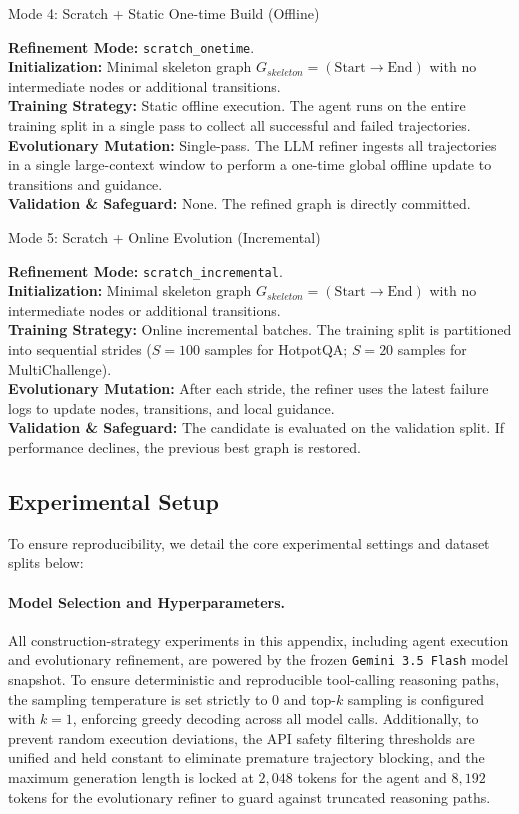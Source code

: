 \begin{modebox}{Mode 4: Scratch + Static One-time Build (Offline)}
\footnotesize\raggedright
\textbf{Refinement Mode:} \texttt{scratch\_onetime}. \\
\textbf{Initialization:} Minimal skeleton graph $G_{skeleton} = (\text{Start} \rightarrow \text{End})$ with no intermediate nodes or additional transitions. \\
\textbf{Training Strategy:} Static offline execution. The agent runs on the entire training split in a single pass to collect all successful and failed trajectories. \\
\textbf{Evolutionary Mutation:} Single-pass. The LLM refiner ingests all trajectories in a single large-context window to perform a one-time global offline update to transitions and guidance. \\
\textbf{Validation \& Safeguard:} None. The refined graph is directly committed.
\end{modebox}
\begin{modebox}{Mode 5: Scratch + Online Evolution (Incremental)}
\footnotesize\raggedright
\textbf{Refinement Mode:} \texttt{scratch\_incremental}. \\
\textbf{Initialization:} Minimal skeleton graph $G_{skeleton} = (\text{Start} \rightarrow \text{End})$ with no intermediate nodes or additional transitions. \\
\textbf{Training Strategy:} Online incremental batches. The training split is partitioned into sequential strides ($S=100$ samples for HotpotQA; $S=20$ samples for MultiChallenge). \\
\textbf{Evolutionary Mutation:} After each stride, the refiner uses the latest failure logs to update nodes, transitions, and local guidance. \\
\textbf{Validation \& Safeguard:} The candidate is evaluated on the validation split. If performance declines, the previous best graph is restored.
\end{modebox}

\subsection{Experimental Setup}
\label{app:construction_setup}
To ensure reproducibility, we detail the core experimental settings and dataset splits below:
\paragraph{Model Selection and Hyperparameters.}
All construction-strategy experiments in this appendix, including agent execution and evolutionary refinement, are powered by the frozen \texttt{Gemini 3.5 Flash} model snapshot. To ensure deterministic and reproducible tool-calling reasoning paths, the sampling temperature is set strictly to $0$ and top-$k$ sampling is configured with $k = 1$, enforcing greedy decoding across all model calls. Additionally, to prevent random execution deviations, the API safety filtering thresholds are unified and held constant to eliminate premature trajectory blocking, and the maximum generation length is locked at $2,048$ tokens for the agent and $8,192$ tokens for the evolutionary refiner to guard against truncated reasoning paths.
